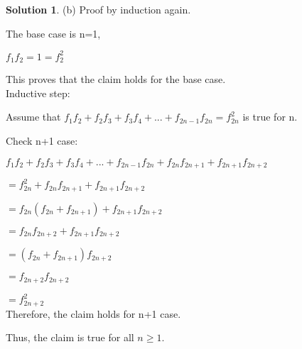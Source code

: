 \documentclass{article}
\theoremstyle{definition}
\newtheorem*{solution}{Solution}
\begin{document}
\begin{solution}
(b) Proof by induction again.

The base case is n=1,

\(f_1f_2 = 1 = f_2^2\)

This proves that the claim holds for the base case.\\

Inductive step:

Assume that \(f_1f_2 + f_2f_3 + f_3f_4 + ... + f_{2n-1}f_{2n} = f_{2n}^2\) is true for n.

Check n+1 case:

\(f_1f_2 + f_2f_3 + f_3f_4 + ... + f_{2n-1}f_{2n}  +  f_{2n}f_{2n+1} +  f_{2n+1}f_{2n+2}\)

\(= f_{2n}^2 +  f_{2n}f_{2n+1} +  f_{2n+1}f_{2n+2}\) 

\(= f_{2n}(f_{2n} + f_{2n+1}) +  f_{2n+1}f_{2n+2}\) 

\(= f_{2n}f_{2n+2} +  f_{2n+1}f_{2n+2}\) 

\(= (f_{2n} +  f_{2n+1})f_{2n+2}\) 

\(= f_{2n+2}f_{2n+2}\) 

\(= f_{2n+2}^2\) \\

Therefore, the claim holds for n+1 case.

Thus, the claim is true for all \(n \ge 1\).\\\\\\

\end{solution}
\end{document}

